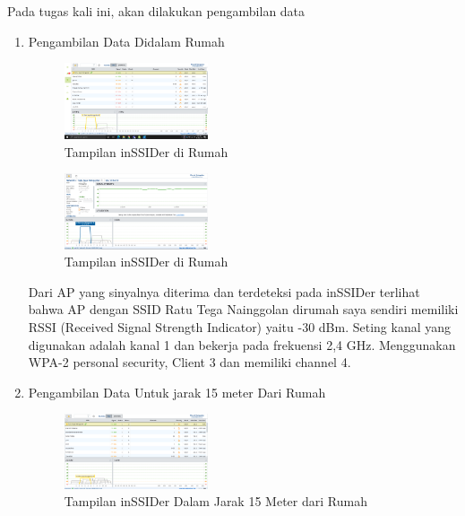 \documentclass[conference]{IEEEtran}
\begin{document}
    Pada tugas kali ini, akan dilakukan pengambilan data
    \begin{enumerate}
    \vspace{0.2cm}
    
        \item Pengambilan Data Didalam Rumah
        
    \begin{figure}[h]
        \centering
        \includegraphics[width=0.4\textwidth]{8.png}
        \caption{Tampilan inSSIDer di Rumah}
    \end{figure}
    
    \begin{figure}[h]
        \centering
        \includegraphics[width=0.4\textwidth]{9.png}
        \caption{Tampilan inSSIDer di Rumah}
    \end{figure}
    \vspace{0.3cm}
    
    Dari AP yang sinyalnya diterima dan terdeteksi pada inSSIDer terlihat bahwa AP dengan SSID Ratu Tega Nainggolan dirumah saya sendiri memiliki RSSI (Received Signal Strength Indicator) yaitu -30 dBm. Seting kanal yang digunakan adalah kanal 1 dan bekerja pada frekuensi 2,4 GHz. Menggunakan WPA-2 personal security, Client 3 dan memiliki channel 4.
    
    \vspace{0.3cm}
    
        \item Pengambilan Data Untuk jarak 15 meter Dari Rumah
        
    \begin{figure}[h]
        \centering
        \includegraphics[width=0.4\textwidth]{10.png}
        \caption{Tampilan inSSIDer Dalam Jarak 15 Meter dari Rumah}
    \end{figure}
    

\end{enumerate}
\end{document}

